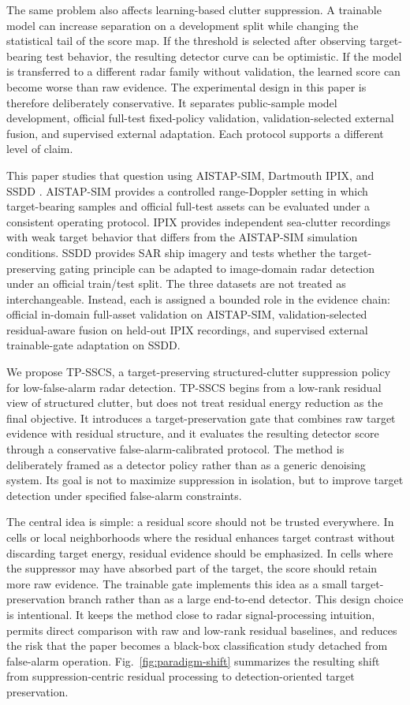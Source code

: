 \documentclass[journal]{IEEEtran}
\begin{document}
The same problem also affects learning-based clutter suppression. A trainable model can increase separation on a development split while changing the statistical tail of the score map. If the threshold is selected after observing target-bearing test behavior, the resulting detector curve can be optimistic. If the model is transferred to a different radar family without validation, the learned score can become worse than raw evidence. The experimental design in this paper is therefore deliberately conservative. It separates public-sample model development, official full-test fixed-policy validation, validation-selected external fusion, and supervised external adaptation. Each protocol supports a different level of claim.

This paper studies that question using AISTAP-SIM, Dartmouth IPIX, and SSDD \cite{vega2024aistap,haykin2002seaclutter,dewind2010database,zhang2021ssdd}. AISTAP-SIM provides a controlled range-Doppler setting in which target-bearing samples and official full-test assets can be evaluated under a consistent operating protocol. IPIX provides independent sea-clutter recordings with weak target behavior that differs from the AISTAP-SIM simulation conditions. SSDD provides SAR ship imagery and tests whether the target-preserving gating principle can be adapted to image-domain radar detection under an official train/test split. The three datasets are not treated as interchangeable. Instead, each is assigned a bounded role in the evidence chain: official in-domain full-asset validation on AISTAP-SIM, validation-selected residual-aware fusion on held-out IPIX recordings, and supervised external trainable-gate adaptation on SSDD.

We propose TP-SSCS, a target-preserving structured-clutter suppression policy for low-false-alarm radar detection. TP-SSCS begins from a low-rank residual view of structured clutter, but does not treat residual energy reduction as the final objective. It introduces a target-preservation gate that combines raw target evidence with residual structure, and it evaluates the resulting detector score through a conservative false-alarm-calibrated protocol. The method is deliberately framed as a detector policy rather than as a generic denoising system. Its goal is not to maximize suppression in isolation, but to improve target detection under specified false-alarm constraints.

The central idea is simple: a residual score should not be trusted everywhere. In cells or local neighborhoods where the residual enhances target contrast without discarding target energy, residual evidence should be emphasized. In cells where the suppressor may have absorbed part of the target, the score should retain more raw evidence. The trainable gate implements this idea as a small target-preservation branch rather than as a large end-to-end detector. This design choice is intentional. It keeps the method close to radar signal-processing intuition, permits direct comparison with raw and low-rank residual baselines, and reduces the risk that the paper becomes a black-box classification study detached from false-alarm operation. Fig.~\ref{fig:paradigm-shift} summarizes the resulting shift from suppression-centric residual processing to detection-oriented target preservation.
\end{document}
